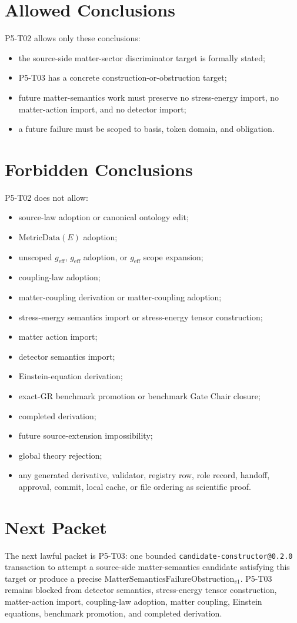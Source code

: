 \documentclass[11pt]{article}
\newcommand{\MetricData}{\mathrm{MetricData}}
\newcommand{\geff}{g_{\mathrm{eff}}}
\newcommand{\FailureObs}{\mathrm{MatterSemanticsFailureObstruction}_{v1}}
\begin{document}
\section{Allowed Conclusions}

P5-T02 allows only these conclusions:
\begin{itemize}[leftmargin=*]
\item the source-side matter-sector discriminator target is formally stated;
\item P5-T03 has a concrete construction-or-obstruction target;
\item future matter-semantics work must preserve no stress-energy import,
  no matter-action import, and no detector import;
\item a future failure must be scoped to basis, token domain, and obligation.
\end{itemize}

\section{Forbidden Conclusions}

P5-T02 does not allow:
\begin{itemize}[leftmargin=*]
\item source-law adoption or canonical ontology edit;
\item \(\MetricData(E)\) adoption;
\item unscoped \(\geff\), \(\geff\) adoption, or \(\geff\) scope expansion;
\item coupling-law adoption;
\item matter-coupling derivation or matter-coupling adoption;
\item stress-energy semantics import or stress-energy tensor construction;
\item matter action import;
\item detector semantics import;
\item Einstein-equation derivation;
\item exact-GR benchmark promotion or benchmark Gate Chair closure;
\item completed derivation;
\item future source-extension impossibility;
\item global theory rejection;
\item any generated derivative, validator, registry row, role record, handoff,
  approval, commit, local cache, or file ordering as scientific proof.
\end{itemize}

\section{Next Packet}

The next lawful packet is P5-T03: one bounded
\texttt{candidate-constructor@0.2.0} transaction to attempt a
source-side matter-semantics candidate satisfying this target or produce a
precise \(\FailureObs\). P5-T03 remains blocked from detector semantics,
stress-energy tensor construction, matter-action import, coupling-law
adoption, matter coupling, Einstein equations, benchmark promotion, and
completed derivation.
\end{document}
